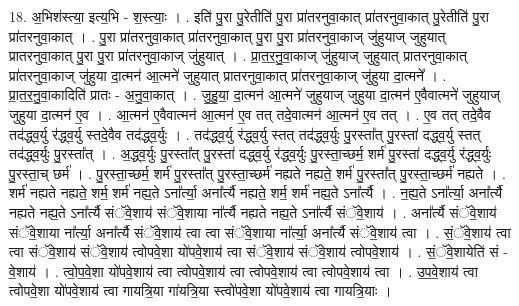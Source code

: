 \documentclass[17pt]{extarticle}
\begin{document}
18. अ॒भिश॑स्त्या॒ इत्य॒भि - श॒स्त्याः॒ । . इति॑ पु॒रा पु॒रेतीति॑ पु॒रा प्रा॑तरनुवा॒कात् प्रा॑तरनुवा॒कात् पु॒रेतीति॑ पु॒रा प्रा॑तरनुवा॒कात् । . पु॒रा प्रा॑तरनुवा॒कात् प्रा॑तरनुवा॒कात् पु॒रा पु॒रा प्रा॑तरनुवा॒काज् जु॑हुयाज् जुहुयात् प्रातरनुवा॒कात् पु॒रा पु॒रा प्रा॑तरनुवा॒काज् जु॑हुयात् । . प्रा॒त॒र॒नु॒वा॒काज् जु॑हुयाज् जुहुयात् प्रातरनुवा॒कात् प्रा॑तरनुवा॒काज् जु॑हुया दा॒त्मन॑ आ॒त्मने॑ जुहुयात् प्रातरनुवा॒कात् प्रा॑तरनुवा॒काज् जु॑हुया दा॒त्मने᳚ । . प्रा॒त॒र॒नु॒वा॒कादिति॑ प्रातः - अ॒नु॒वा॒कात् । . जु॒हु॒या॒ दा॒त्मन॑ आ॒त्मने॑ जुहुयाज् जुहुया दा॒त्मन॑ ए॒वैवात्मने॑ जुहुयाज् जुहुया दा॒त्मन॑ ए॒व । . आ॒त्मन॑ ए॒वैवात्मन॑ आ॒त्मन॑ ए॒व तत् तदे॒वात्मन॑ आ॒त्मन॑ ए॒व तत् । . ए॒व तत् तदे॒वैव तद॑द्ध्व॒र्यु र॑द्ध्व॒र्यु स्तदे॒वैव तद॑द्ध्व॒र्युः । . तद॑द्ध्व॒र्यु र॑द्ध्व॒र्यु स्तत् तद॑द्ध्व॒र्युः पु॒रस्ता᳚त् पु॒रस्ता॑ दद्ध्व॒र्यु स्तत् तद॑द्ध्व॒र्युः पु॒रस्ता᳚त् । . अ॒द्ध्व॒र्युः पु॒रस्ता᳚त् पु॒रस्ता॑ दद्ध्व॒र्यु र॑द्ध्व॒र्युः पु॒रस्ता॒च्छर्म॒ शर्म॑ पु॒रस्ता॑ दद्ध्व॒र्यु र॑द्ध्व॒र्युः पु॒रस्ता॒च् छर्म॑ । . पु॒रस्ता॒च्छर्म॒ शर्म॑ पु॒रस्ता᳚त् पु॒रस्ता॒च्छर्म॑ नह्यते नह्यते॒ शर्म॑ पु॒रस्ता᳚त् पु॒रस्ता॒च्छर्म॑ नह्यते । . शर्म॑ नह्यते नह्यते॒ शर्म॒ शर्म॑ नह्य॒ते ऽना᳚र्त्या॒ अना᳚र्त्यै नह्यते॒ शर्म॒ शर्म॑ नह्य॒ते ऽना᳚र्त्यै । . न॒ह्य॒ते ऽना᳚र्त्या॒ अना᳚र्त्यै नह्यते नह्य॒ते ऽना᳚र्त्यै संॅवे॒शाय॑ संॅवे॒शाया ना᳚र्त्यै नह्यते नह्य॒ते ऽना᳚र्त्यै संॅवे॒शाय॑ । . अना᳚र्त्यै संॅवे॒शाय॑ संॅवे॒शाया ना᳚र्त्या॒ अना᳚र्त्यै संॅवे॒शाय॑ त्वा त्वा संॅवे॒शाया ना᳚र्त्या॒ अना᳚र्त्यै संॅवे॒शाय॑ त्वा । . सं॒ॅवे॒शाय॑ त्वा त्वा संॅवे॒शाय॑ संॅवे॒शाय॑ त्वोपवे॒शा यो॑पवे॒शाय॑ त्वा संॅवे॒शाय॑ संॅवे॒शाय॑ त्वोपवे॒शाय॑ । . सं॒ॅवे॒शायेति॑ सं - वे॒शाय॑ । . त्वो॒प॒वे॒शा यो॑पवे॒शाय॑ त्वा त्वोपवे॒शाय॑ त्वा त्वोपवे॒शाय॑ त्वा त्वोपवे॒शाय॑ त्वा । . उ॒प॒वे॒शाय॑ त्वा त्वोपवे॒शा यो॑पवे॒शाय॑ त्वा गायत्रि॒या गा॑यत्रि॒या स्त्वो॑पवे॒शा यो॑पवे॒शाय॑ त्वा गायत्रि॒याः । \newline
\end{document}
